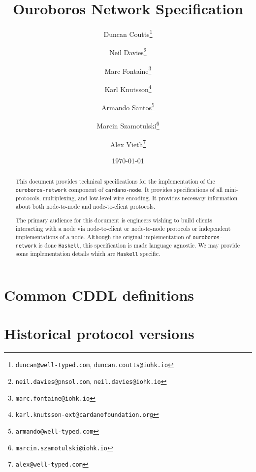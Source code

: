 \documentclass{report}
\begin{document}
\title{Ouroboros Network Specification}
\author{
  Duncan Coutts\footnote{\small \texttt{duncan@well-typed.com}, {\small \texttt{duncan.coutts@iohk.io}}}
\and
  Neil Davies\footnote{{\small \texttt{neil.davies@pnsol.com}}, {\small \texttt{neil.davies@iohk.io}}}
\and
  Marc Fontaine\footnote{{\small \texttt{marc.fontaine@iohk.io}}}
\and
  Karl Knutsson\footnote{{\small \texttt{karl.knutsson-ext@cardanofoundation.org}}}
\and
  Armando Santos\footnote{{\small \texttt{armando@well-typed.com}}}
\and
  Marcin Szamotulski\footnote{{\small \texttt{marcin.szamotulski@iohk.io}}}
\and
  Alex Vieth\footnote{{\small \texttt{alex@well-typed.com}}}
}
\date{\today}

\maketitle

\begin{abstract}
  This document provides technical specifications for the implementation of the
  \texttt{ouroboros-network} component of \texttt{cardano-node}. It provides specifications of all
  mini-protocols, multiplexing, and low-level wire encoding.  It provides
  necessary information about both node-to-node and node-to-client protocols.

  The primary audience for this document is engineers wishing to build
  clients interacting with a node via node-to-client or node-to-node protocols
  or independent implementations of a node.  Although the original
  implementation of \texttt{ouroboros-network} is done \texttt{Haskell}, this specification is
  made language agnostic. We may provide some implementation details which are
  \texttt{Haskell} specific.
\end{abstract}

\tableofcontents

\listoftodos
\pagebreak

% 




% 

\appendix

\chapter{Common CDDL definitions}
\label{cddl-common}


\chapter{Historical protocol versions}
\label{historical-protocol-versions}
\end{document}
